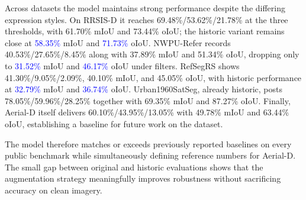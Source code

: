 Across datasets the model maintains strong performance despite the differing expression styles. On RRSIS-D it reaches 69.48\%/53.62\%/21.78\% at the three thresholds, with 61.70\% mIoU and 73.44\% oIoU; the historic variant remains close at \textcolor{blue}{58.35\%} mIoU and \textcolor{blue}{71.73\%} oIoU. NWPU-Refer records 40.53\%/27.65\%/8.45\% along with 37.89\% mIoU and 51.34\% oIoU, dropping only to \textcolor{blue}{31.52\%} mIoU and \textcolor{blue}{46.17\%} oIoU under filters. RefSegRS shows 41.30\%/9.05\%/2.09\%, 40.10\% mIoU, and 45.05\% oIoU, with historic performance at \textcolor{blue}{32.79\%} mIoU and \textcolor{blue}{36.74\%} oIoU. Urban1960SatSeg, already historic, posts 78.05\%/59.96\%/28.25\% together with 69.35\% mIoU and 87.27\% oIoU. Finally, Aerial-D itself delivers 60.10\%/43.95\%/13.05\% with 49.78\% mIoU and 63.44\% oIoU, establishing a baseline for future work on the dataset.

The model therefore matches or exceeds previously reported baselines on every public benchmark while simultaneously defining reference numbers for Aerial-D. The small gap between original and historic evaluations shows that the augmentation strategy meaningfully improves robustness without sacrificing accuracy on clean imagery.

\begin{table}[H]
\centering
\caption{Combined training performance across five aerial referring segmentation datasets (historic validation results in \textcolor{blue}{blue}).}
\label{tab:combined_training_results}
\end{table}

